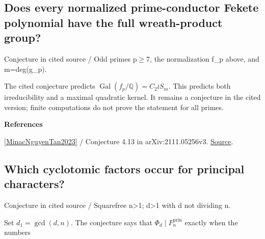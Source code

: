 \documentclass[11pt,a4paper,oneside,openany]{book}
\newenvironment{sources}{\par\smallskip\begingroup\footnotesize\color{atlasgray}\leftskip=10pt\setlength{\parskip}{2pt}}{\par\endgroup\smallskip}
\begin{document}
\subsection*{Does every normalized prime-conductor Fekete polynomial have the full wreath-product group?}
{\small\sffamily\color{atlasgold}Conjecture in cited source / Odd primes p\ensuremath{\ge}7, the normalization f\_\allowbreak{}p above, and m=deg(g\_\allowbreak{}p).}\par\smallskip
\color{black} The cited conjecture predicts \(\operatorname{Gal}(f_p/\mathbb Q)=C_2\wr S_m\). This predicts both irreducibility and a maximal quadratic kernel. It remains a conjecture in the cited version; finite computations do not prove the statement for all primes.\par
\begin{sources}
\textbf{References}\par\smallskip
\noindent\hyperlink{ref:MinacNguyenTan2023}{[MinacNguyenTan2023]} / Conjecture 4.13 in arXiv:2111.05256v3.  \href{https://arxiv.org/abs/2111.05256}{Source}.\par
\end{sources}\color{black}
\subsection*{Which cyclotomic factors occur for principal characters?}
{\small\sffamily\color{atlasgold}Conjecture in cited source / Squarefree n>1; d>1 with d not dividing n.}\par\smallskip
\color{black} Set \(d_1=\gcd(d,n)\). The conjecture says that \(\Phi_d\mid F_n^{\mathrm{prin}}\) exactly when the numbers\par
\end{document}
